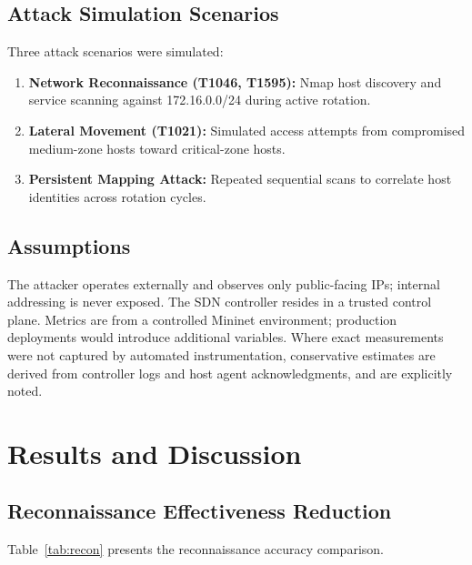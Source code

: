 \documentclass[conference]{IEEEtran}
\begin{document}
\subsection{Attack Simulation Scenarios}

Three attack scenarios were simulated:

\begin{enumerate}
    \item \textbf{Network Reconnaissance (T1046, T1595):} Nmap host discovery and service scanning against 172.16.0.0/24 during active rotation.
    \item \textbf{Lateral Movement (T1021):} Simulated access attempts from compromised medium-zone hosts toward critical-zone hosts.
    \item \textbf{Persistent Mapping Attack:} Repeated sequential scans to correlate host identities across rotation cycles.
\end{enumerate}

\subsection{Assumptions}

The attacker operates externally and observes only public-facing IPs; internal addressing is never exposed. The SDN controller resides in a trusted control plane. Metrics are from a controlled Mininet environment; production deployments would introduce additional variables. Where exact measurements were not captured by automated instrumentation, conservative estimates are derived from controller logs and host agent acknowledgments, and are explicitly noted.

\section{Results and Discussion}

\subsection{Reconnaissance Effectiveness Reduction}

Table~\ref{tab:recon} presents the reconnaissance accuracy comparison.
\end{document}
